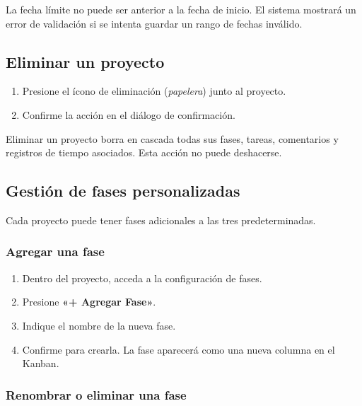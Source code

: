 \documentclass[12pt, a4paper]{article}
\begin{document}
\begin{warningbox}
La fecha límite no puede ser anterior a la fecha de inicio. El sistema mostrará un error de validación si se intenta guardar un rango de fechas inválido.
\end{warningbox}

\subsection{Eliminar un proyecto}

\begin{enumerate}
  \item Presione el ícono de eliminación (\emph{papelera}) junto al proyecto.
  \item Confirme la acción en el diálogo de confirmación.
\end{enumerate}

\begin{warningbox}
Eliminar un proyecto borra en cascada todas sus fases, tareas, comentarios y registros de tiempo asociados. Esta acción no puede deshacerse.
\end{warningbox}

\subsection{Gestión de fases personalizadas}

Cada proyecto puede tener fases adicionales a las tres predeterminadas.

\subsubsection{Agregar una fase}

\begin{enumerate}
  \item Dentro del proyecto, acceda a la configuración de fases.
  \item Presione \textbf{«+ Agregar Fase»}.
  \item Indique el nombre de la nueva fase.
  \item Confirme para crearla. La fase aparecerá como una nueva columna en el Kanban.
\end{enumerate}

\subsubsection{Renombrar o eliminar una fase}
\end{document}
